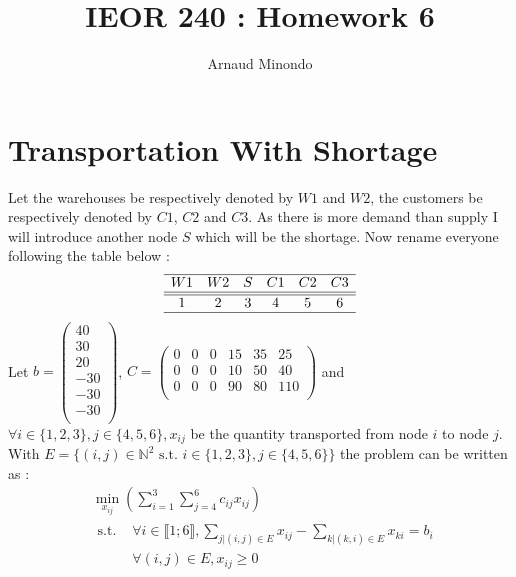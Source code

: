 \documentclass{article}
\title{IEOR 240 : Homework 6}
\author{Arnaud Minondo}
\begin{document}
\maketitle
\section*{Transportation With Shortage}
Let the warehouses be respectively denoted by $W1$ and $W2$, the customers be respectively denoted by $C1$, $C2$ and $C3$.
 As there is more demand than supply I will introduce another node $S$ which will be the shortage.
 Now rename everyone following the table below : $$\begin{array}{cccccc}
    \hline
    W1 & W2 & S & C1 & C2&C3 \\\hline\hline
    1 & 2 & 3 & 4 & 5 & 6\\\hline
 \end{array}$$
Let $b = \left(\begin{array}{c}
    40\\
    30\\
    20\\
    -30\\
    -30\\
    -30\\
\end{array}\right)$, $C = \left(\begin{array}{cccccc}
    0& 0& 0 & 15& 35& 25 \\
    0& 0& 0 & 10& 50& 40 \\
    0& 0& 0 & 90& 80& 110\\
\end{array}\right)$ and $\forall i\in\{1,2,3\},j\in\{4,5,6\}, x_{ij}$ be the quantity transported from node $i$ to node $j$. With $E = \{(i,j)\in\mathbb{N}^2 \text{ s.t. } i\in\{1,2,3\},j\in\{4,5,6\}\}$ the problem can be written as :
$$\boxed{\begin{split} & \min\limits_{x_{ij}}\left(\sum\limits_{i=1}^{3}\sum\limits_{j=4}^{6}c_{ij}x_{ij}\right)\\
        &\begin{split}\text{s.t. }&\forall i\in\llbracket 1; 6\rrbracket, \sum\limits_{j|(i,j)\in E}x_{ij} - \sum\limits_{k|(k,i)\in E}x_{ki} = b_i\\
        & \forall (i,j)\in E, x_{ij}\ge 0\\
    \end{split}\\
\end{split}}$$
\end{document}
